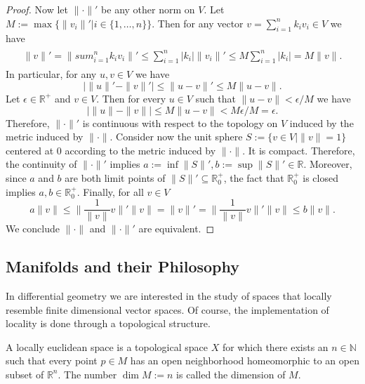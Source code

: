 \begin{proof}
	Now let $\|\cdot\|'$ be any other norm on $V$. Let $M:=\max\{\|v_i\|'|i\in\{1,\dots,n\}\}$. Then for any vector $v=\sum_{i=1}^nk_iv_i\in V$ we have
	\begin{align}
	\begin{split}
		\|v\|'=\|sum_{i=1}^nk_iv_i\|'\leq\sum_{i=1}^n|k_i|\|v_i\|'\leq M\sum_{i=1}^n|k_i|=M\|v\|.
	\end{split}
	\end{align}
In particular, for any $u,v\in V$ we have
	\begin{equation}
		|\|u\|'-\|v\|'|\leq\|u-v\|'\leq M\|u-v\|.
	\end{equation}
Let $\epsilon\in\mathbb{R}^+$ and $v\in V$. Then for every $u\in V$ such that $\|u-v\|<\epsilon/M$ we have
	\begin{equation}
		|\|u\|-\|v\||\leq M\|u-v\|<M\epsilon/M=\epsilon.
	\end{equation} 
Therefore, $\|\cdot\|'$ is continuous with respect to the topology on $V$ induced by the metric induced by $\|\cdot\|$. Consider now the unit sphere $S:=\{v\in V|\|v\|=1\}$ centered at $0$ according to the metric induced by $\|\cdot\|$. It is compact. Therefore, the continuity of $\|\cdot\|'$ implies $a:=\inf\|S\|',b:=\sup\|S\|'\in\mathbb{R}$. Moreover, since $a$ and $b$ are both limit points of $\|S\|'\subseteq\mathbb{R}^+_0$, the fact that $\mathbb{R}^+_0$ is closed implies $a,b\in\mathbb{R}^+_0$. Finally, for all $v\in V$
\begin{equation}
a\|v\|\leq\|\frac{1}{\|v\|}v\|'\|v\|=\|v\|'=\|\frac{1}{\|v\|}v\|'\|v\|\leq b\|v\|.
\end{equation}
We conclude $\|\cdot\|$ and $\|\cdot\|'$ are equivalent.
\end{proof}

\subsection{Manifolds and their Philosophy}

In differential geometry we are interested in the study of spaces that locally resemble finite dimensional vector spaces. Of course, the implementation of locality is done through a topological structure. 

\begin{definition}

	A locally euclidean space is a topological space $X$ for which there exists an $n\in\mathbb{N}$ such that every point $p\in M$ has an open neighborhood homeomorphic to an open subset of $\mathbb{R}^n$. The number $\dim M:=n$ is called the dimension of $M$.

\end{definition}

